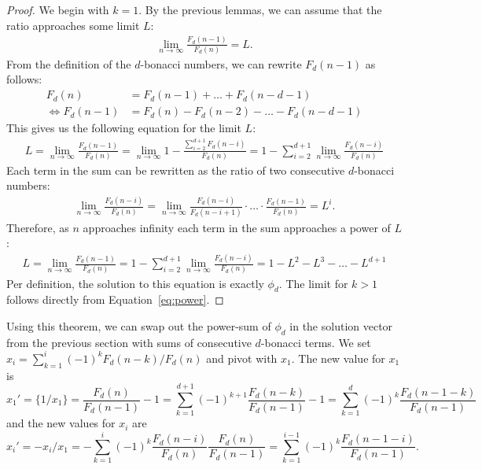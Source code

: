 \documentclass[english,version-2020-11]{uzl-thesis}
\begin{document}
\begin{proof}
  We begin with $k = 1$.
  By the previous lemmas, we can assume that the ratio approaches some limit $L$:
  \begin{align*}
    \lim_{n \to \infty} \frac{F_d(n - 1)}{F_d(n)} = L.
  \end{align*}
  From the definition of the $d$-bonacci numbers, we can rewrite $F_d(n - 1)$ as follows:
  \begin{align*}
    F_d(n) & = F_d(n - 1) + \dots + F_d(n - d - 1) \\
    \Leftrightarrow F_d(n - 1) & = F_d(n) - F_d(n - 2) - \dots - F_d(n - d - 1)
  \end{align*}
  This gives us the following equation for the limit $L$:
  \begin{align*}
    L = \lim_{n \to \infty} \frac{F_d(n - 1)}{F_d(n)}
      = \lim_{n \to \infty} 1 - \frac{\sum_{i=2}^{d+1} F_d(n - i)}{F_d(n)}
      = 1 - \sum_{i=2}^{d+1} \lim_{n \to \infty} \frac{F_d(n - i)}{F_d(n)}
  \end{align*}
  Each term in the sum can be rewritten as the ratio of two consecutive $d$-bonacci numbers:
  \begin{align}
    \label{eq:power}
    \lim_{n\to\infty} \frac{F_d(n - i)}{F_d(n)} = \lim_{n\to\infty}\frac{F_d(n - i)}{F_d(n - i + 1)} \cdot \ldots \cdot \frac{F_d(n - 1)}{F_d(n)} = L^i.
  \end{align}
  Therefore, as $n$ approaches infinity each term in the sum approaches a power of $L$:
  \begin{align*}
    L = \lim_{n \to \infty} \frac{F_d(n - 1)}{F_d(n)}
      = 1 - \sum_{i=2}^{d+1} \lim_{n \to \infty} \frac{F_d(n - i)}{F_d(n)}
      = 1 - L^2 - L^3 - \dots - L^{d+1}
  \end{align*}
  Per definition, the solution to this equation is exactly $\phi_d$.
  The limit for $k > 1$ follows directly from Equation~\ref{eq:power}.
\end{proof}

Using this theorem, we can swap out the power-sum of $\phi_d$ in the solution
vector from the previous section with sums of consecutive $d$-bonacci terms.
We set $x_i = \sum_{k=1}^i (-1)^k F_d(n - k) / F_d(n)$ and pivot with $x_1$.
The new value for $x_1$ is
\[
  x_1'
  = \{1/x_1\}
  = \frac{F_d(n)}{F_d(n - 1)} - 1
  = \sum_{k=1}^{d+1} (-1)^{k + 1} \frac{F_d(n - k)}{F_d(n - 1)} - 1
  = \sum_{k=1}^d (-1)^k \frac{F_d(n - 1 - k)}{F_d(n - 1)}
\]
and the new values for $x_i$ are
\[
  x_i'
  = -x_i / x_1
  = -\sum_{k=1}^i (-1)^k \frac{F_d(n - i)}{F_d(n)} \frac{F_d(n)}{F_d(n - 1)}
  = \sum_{k=1}^{i-1} (-1)^k \frac{F_d(n - 1 - i)}{F_d(n - 1)}.
\]
\end{document}
